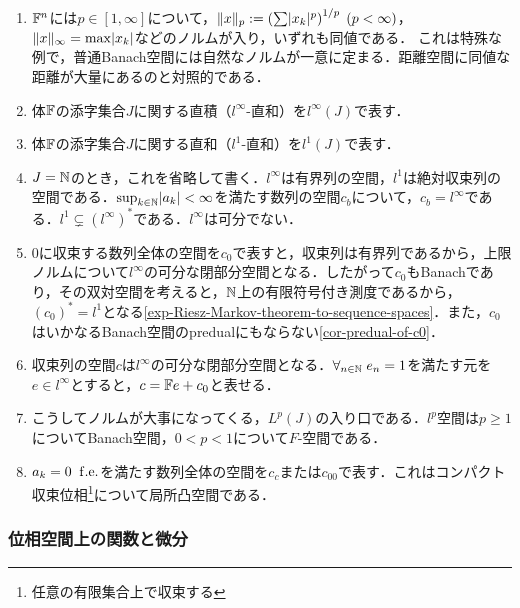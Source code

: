 \documentclass[uplatex,dvipdfmx]{jsreport}
\begin{document}
\begin{example}[体の積]\mbox{}
    \begin{enumerate}
        \item $\mathbb{F}^n$には$p\in[1,\infty]$について，$\|x\|_p:=\left(\sum\lvert x_k\rvert^p\right)^{1/p}\;(p<\infty)$，$\|x\|_\infty=\max\lvert x_k\rvert$などのノルムが入り，いずれも同値である．
        これは特殊な例で，普通Banach空間には自然なノルムが一意に定まる．距離空間に同値な距離が大量にあるのと対照的である．
        \item 体$\mathbb{F}$の添字集合$J$に関する直積（$l^\infty$-直和）を$l^\infty(J)$で表す．
        \item 体$\mathbb{F}$の添字集合$J$に関する直和（$l^1$-直和）を$l^1(J)$で表す．
        \item $J=\mathbb{N}$のとき，これを省略して書く．$l^\infty$は有界列の空間，$l^1$は絶対収束列の空間である．$\sup_{k\in\mathbb{N}}\lvert a_k\rvert<\infty$を満たす数列の空間$c_b$について，$c_b=l^\infty$である．$l^1\subsetneq(l^\infty)^*$である．$l^\infty$は可分でない．
        \item $0$に収束する数列全体の空間を$c_0$で表すと，収束列は有界列であるから，上限ノルムについて$l^\infty$の可分な閉部分空間となる．したがって$c_0$もBanachであり，その双対空間を考えると，$\mathbb{N}$上の有限符号付き測度であるから，$(c_0)^*=l^1$となる\ref{exp-Riesz-Markov-theorem-to-sequence-spaces}．また，$c_0$はいかなるBanach空間のpredualにもならない\ref{cor-predual-of-c0}．
        \item 収束列の空間$c$は$l^\infty$の可分な閉部分空間となる．$\forall_{n\in\mathbb{N}}\;e_n=1$を満たす元を$e\in l^\infty$とすると，$c=\mathbb{F} e+c_0$と表せる．
        \item こうしてノルムが大事になってくる，$L^p(J)$の入り口である．$l^p$空間は$p\ge 1$についてBanach空間，$0<p<1$について$F$-空間である．
        \item $a_k=0\;\;\mathrm{f.e.}$を満たす数列全体の空間を$c_c$または$c_{00}$で表す．これはコンパクト収束位相\footnote{任意の有限集合上で収束する}について局所凸空間である．
    \end{enumerate}
\end{example}

\subsubsection{位相空間上の関数と微分}
\end{document}
